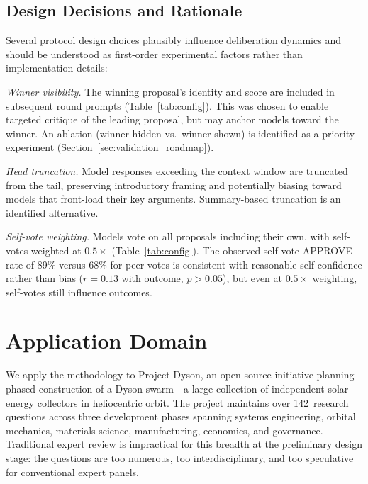 \documentclass[11pt,a4paper]{article}
\begin{document}
\subsection{Design Decisions and Rationale}
\label{sec:design_decisions}

Several protocol design choices plausibly influence deliberation dynamics and should be understood as first-order experimental factors rather than implementation details:

\textit{Winner visibility.} The winning proposal's identity and score are included in subsequent round prompts (Table~\ref{tab:config}). This was chosen to enable targeted critique of the leading proposal, but may anchor models toward the winner. An ablation (winner-hidden vs.\ winner-shown) is identified as a priority experiment (Section~\ref{sec:validation_roadmap}).

\textit{Head truncation.} Model responses exceeding the context window are truncated from the tail, preserving introductory framing and potentially biasing toward models that front-load their key arguments. Summary-based truncation is an identified alternative.

\textit{Self-vote weighting.} Models vote on all proposals including their own, with self-votes weighted at $0.5\times$ (Table~\ref{tab:config}). The observed self-vote APPROVE rate of 89\% versus 68\% for peer votes is consistent with reasonable self-confidence rather than bias ($r = 0.13$ with outcome, $p > 0.05$), but even at $0.5\times$ weighting, self-votes still influence outcomes.

\section{Application Domain}
\label{sec:domain}

We apply the methodology to Project Dyson, an open-source initiative planning phased construction of a Dyson swarm---a large collection of independent solar energy collectors in heliocentric orbit. The project maintains over 142~research questions across three development phases spanning systems engineering, orbital mechanics, materials science, manufacturing, economics, and governance. Traditional expert review is impractical for this breadth at the preliminary design stage: the questions are too numerous, too interdisciplinary, and too speculative for conventional expert panels.
\end{document}

